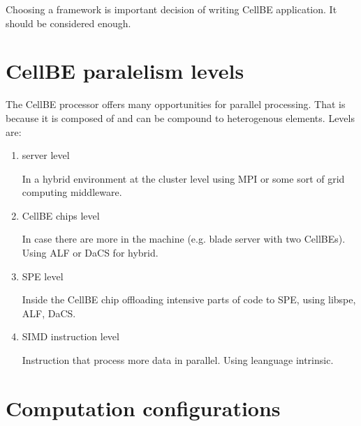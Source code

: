 Choosing a framework is important decision of writing CellBE application. It should be considered enough.

\section {CellBE paralelism levels}

The CellBE processor offers many opportunities for parallel processing. That is because it is composed of and can be compound to heterogenous elements. Levels are:
\begin{enumerate}
\item server level
\par
In a hybrid environment at the cluster level using MPI or some sort of grid computing middleware.

\item CellBE chips level
\par
In case there are more in the machine (e.g. blade server with two CellBEs). Using ALF or DaCS for hybrid.

\item SPE level
\par
Inside the CellBE chip offloading intensive parts of code to SPE, using libspe, ALF, DaCS.

\item SIMD instruction level
\par
Instruction that process more data in parallel. Using leanguage intrinsic.
\end{enumerate}

\section{Computation configurations}

